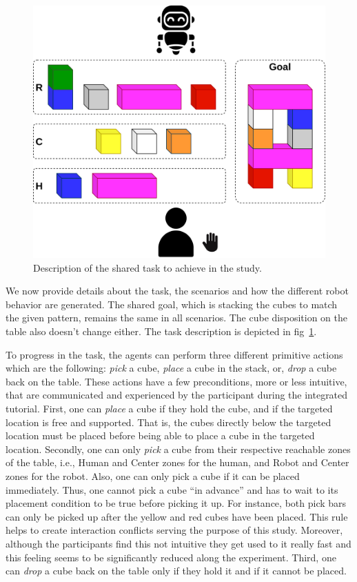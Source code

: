 \begin{figure}
    \centering
    \includegraphics[width=0.8\linewidth]{images/Chapter5/task_description_study.png}
    \caption{Description of the shared task to achieve in the study.}
    \label{fig:task_description_study}
\end{figure}

We now provide details about the task, the scenarios and how the different robot behavior are generated. 
The shared goal, which is stacking the cubes to match the given pattern, remains the same in all scenarios. The cube disposition on the table also doesn't change either. The task description is depicted in fig~\ref{fig:task_description_study}. 

To progress in the task, the agents can perform three different primitive actions which are the following: \textit{pick} a cube, \textit{place} a cube in the stack, or, \textit{drop} a cube back on the table.
These actions have a few preconditions, more or less intuitive, that are communicated and experienced by the participant during the integrated tutorial.
First, one can \textit{place} a cube if they hold the cube, and if the targeted location is free and supported. That is, the cubes directly below the targeted location must be placed before being able to place a cube in the targeted location.
Secondly, one can only \textit{pick} a cube from their respective reachable zones of the table, i.e., Human and Center zones for the human, and Robot and Center zones for the robot. Also, one can only pick a cube if it can be placed immediately. Thus, one cannot pick a cube ``in advance'' and has to wait to its placement condition to be true before picking it up. For instance, both pick bars can only be picked up after the yellow and red cubes have been placed. This rule helps to create interaction conflicts serving the purpose of this study. Moreover, although the participants find this not intuitive they get used to it really fast and this feeling seems to be significantly reduced along the experiment.
Third, one can \textit{drop} a cube back on the table only if they hold it and if it cannot be placed.

